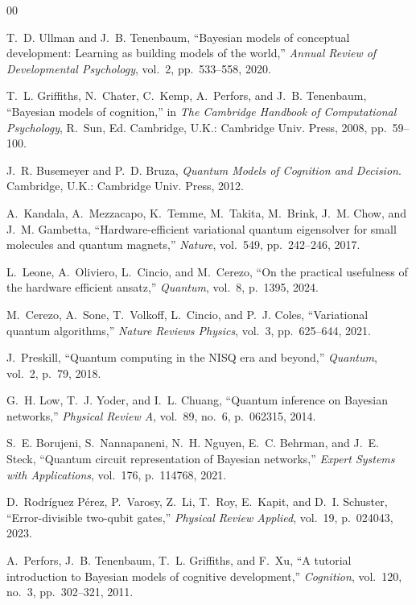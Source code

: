 \documentclass[conference]{IEEEtran}
\begin{document}
\begin{thebibliography}{00}

T.~D. Ullman and J.~B. Tenenbaum,
``Bayesian models of conceptual development: Learning as building models of the world,''
\textit{Annual Review of Developmental Psychology}, vol.~2, pp.~533--558, 2020.

T.~L. Griffiths, N.~Chater, C.~Kemp, A.~Perfors, and J.~B. Tenenbaum,
``Bayesian models of cognition,''
in \textit{The Cambridge Handbook of Computational Psychology},
R.~Sun, Ed. Cambridge, U.K.: Cambridge Univ. Press, 2008, pp.~59--100.

J.~R. Busemeyer and P.~D. Bruza,
\textit{Quantum Models of Cognition and Decision}.
Cambridge, U.K.: Cambridge Univ. Press, 2012.

A.~Kandala, A.~Mezzacapo, K.~Temme, M.~Takita, M.~Brink, J.~M. Chow, and J.~M. Gambetta,
``Hardware-efficient variational quantum eigensolver for small molecules and quantum magnets,''
\textit{Nature}, vol.~549, pp.~242--246, 2017.

L.~Leone, A.~Oliviero, L.~Cincio, and M.~Cerezo,
``On the practical usefulness of the hardware efficient ansatz,''
\textit{Quantum}, vol.~8, p.~1395, 2024.

M.~Cerezo, A.~Sone, T.~Volkoff, L.~Cincio, and P.~J. Coles,
``Variational quantum algorithms,''
\textit{Nature Reviews Physics}, vol.~3, pp.~625--644, 2021.

J.~Preskill,
``Quantum computing in the NISQ era and beyond,''
\textit{Quantum}, vol.~2, p.~79, 2018.

G.~H. Low, T.~J. Yoder, and I.~L. Chuang,
``Quantum inference on Bayesian networks,''
\textit{Physical Review A}, vol.~89, no.~6, p.~062315, 2014.

S.~E. Borujeni, S.~Nannapaneni, N.~H. Nguyen, E.~C. Behrman, and J.~E. Steck,
``Quantum circuit representation of Bayesian networks,''
\textit{Expert Systems with Applications}, vol.~176, p.~114768, 2021.

D.~Rodr\'iguez P\'erez, P.~Varosy, Z.~Li, T.~Roy, E.~Kapit, and D.~I. Schuster,
``Error-divisible two-qubit gates,''
\textit{Physical Review Applied}, vol.~19, p.~024043, 2023.

A.~Perfors, J.~B. Tenenbaum, T.~L. Griffiths, and F.~Xu,
``A tutorial introduction to Bayesian models of cognitive development,''
\textit{Cognition}, vol.~120, no.~3, pp.~302--321, 2011.


\end{thebibliography}
\end{document}

